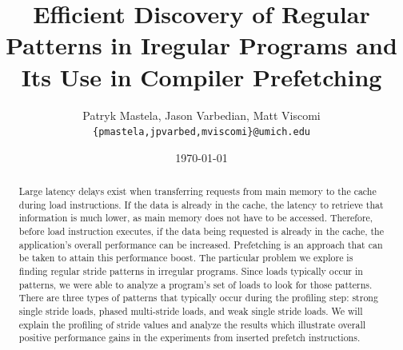 \documentclass[11pt]{article}
\title{Efficient Discovery of Regular Patterns in Iregular Programs and Its Use in Compiler Prefetching}
\author{Patryk Mastela, Jason Varbedian, Matt Viscomi \\
  \small {\texttt {\{pmastela,jpvarbed,mviscomi\}@umich.edu}}}
\date{\today}
\begin{document}
  \maketitle
  \begin{abstract}
    Large latency delays exist when transferring requests from main memory to the cache during load instructions. If the data is already in the cache, the latency to retrieve that information is much lower, as main memory does not have to be accessed. Therefore, before load instruction executes, if the data being requested is already in the cache, the application’s overall performance can be increased. Prefetching is an approach that can be taken to attain this performance boost. The particular problem we explore is finding regular stride patterns in irregular programs. Since loads typically occur in patterns, we were able to analyze a program’s set of loads to look for those patterns. There are three types of patterns that typically occur during the profiling step: strong single stride loads, phased multi-stride loads, and weak single stride loads. We will explain the profiling of stride values and analyze the results which illustrate overall positive performance gains in the experiments from inserted prefetch instructions.
  \end{abstract}
\end{document}
